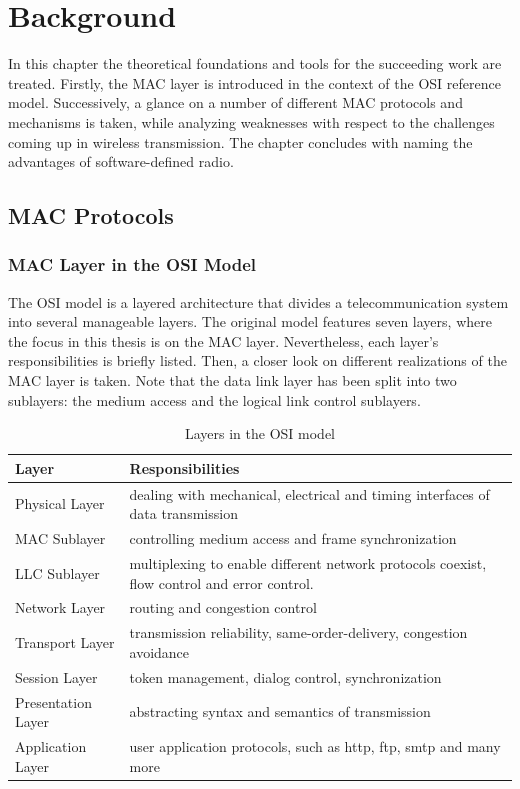 \chapter{Background}

In this chapter the theoretical foundations and tools for the succeeding work are treated.
Firstly, the MAC layer is introduced in the context of the OSI reference model. Successively, a glance on a number of different MAC protocols and mechanisms is taken, while analyzing weaknesses with respect to the challenges coming up in wireless transmission. The chapter concludes with naming the advantages of software-defined radio.   

\bigskip

\section{MAC Protocols}

\subsection{MAC Layer in the OSI Model}

The OSI model is a layered architecture that divides a telecommunication system into several manageable layers. The original model features seven layers, where the focus in this thesis is on the MAC layer. Nevertheless, each layer's responsibilities is briefly listed. Then, a closer look on different realizations of the MAC layer is taken. Note that the data link layer has been split into two sublayers: the medium access and the logical link control sublayers.


\begin{table}[h]
	\centering
	\begin{center}
		\begin{tabular}{p{3.5cm}p{10cm}}
			\toprule
				Layer & Responsibilities \\
			\midrule
				Physical Layer & dealing with mechanical, electrical and timing interfaces of data transmission  \\
				MAC Sublayer & controlling medium access and frame synchronization \\
				LLC Sublayer & multiplexing to enable different network protocols coexist, flow control and error control.  \\
				Network Layer & routing and congestion control \\
				Transport Layer & transmission reliability, same-order-delivery, congestion avoidance  \\
				Session Layer & token management, dialog control, synchronization \\
				Presentation Layer & abstracting syntax and semantics of transmission \\
				Application Layer & user application protocols, such as http, ftp, smtp and many more \\
			\bottomrule
		\end{tabular}\caption{Layers in the OSI model} \label{tab:osi-layers}
	\end{center}
\end{table}

